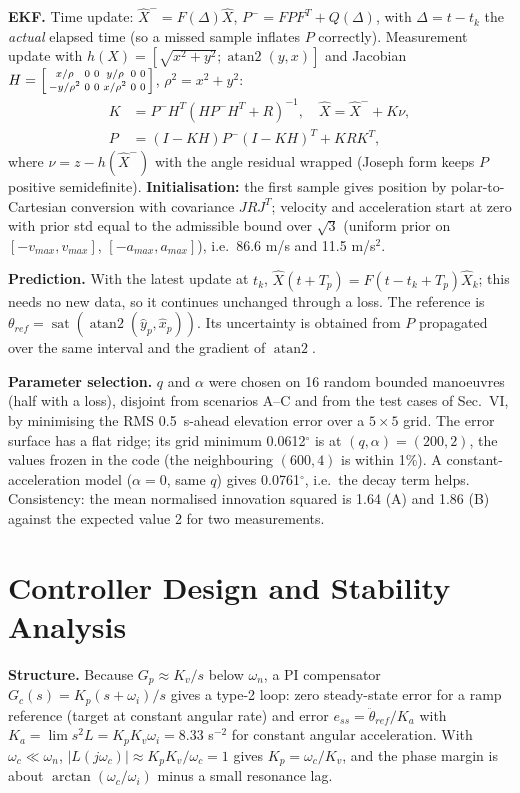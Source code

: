 \documentclass[conference]{IEEEtran}
\newcommand{\dg}{^\circ}
\begin{document}
\textbf{EKF.} Time update: $\hat X^-=F(\Delta)\hat X$, $P^-=FPF^T+Q(\Delta)$, with $\Delta=t-t_{k}$ the \emph{actual} elapsed time (so a missed sample inflates $P$ correctly). Measurement update with $h(X)=[\sqrt{x^2+y^2};\operatorname{atan2}(y,x)]$ and Jacobian $H=\begin{bsmallmatrix}x/\rho&0&0&y/\rho&0&0\\-y/\rho^2&0&0&x/\rho^2&0&0\end{bsmallmatrix}$, $\rho^2=x^2+y^2$:
\begin{align}
K&=P^-H^T(HP^-H^T+R)^{-1},\quad \hat X=\hat X^-+K\nu,\\
P&=(I-KH)P^-(I-KH)^T+KRK^T,
\end{align}
where $\nu=z-h(\hat X^-)$ with the angle residual wrapped (Joseph form keeps $P$ positive semidefinite). \textbf{Initialisation:} the first sample gives position by polar-to-Cartesian conversion with covariance $JRJ^T$; velocity and acceleration start at zero with prior std equal to the admissible bound over $\sqrt3$ (uniform prior on $[-v_{max},v_{max}]$, $[-a_{max},a_{max}]$), i.e.\ 86.6 m/s and 11.5 m/s$^2$.

\textbf{Prediction.} With the latest update at $t_k$, $\hat X(t+T_p)=F(t-t_k+T_p)\hat X_k$; this needs no new data, so it continues unchanged through a loss. The reference is $\theta_{ref}=\operatorname{sat}(\operatorname{atan2}(\hat y_p,\hat x_p))$. Its uncertainty is obtained from $P$ propagated over the same interval and the gradient of $\operatorname{atan2}$.

\textbf{Parameter selection.} $q$ and $\alpha$ were chosen on 16 random bounded manoeuvres (half with a loss), disjoint from scenarios A--C and from the test cases of Sec.~VI, by minimising the RMS 0.5~s-ahead elevation error over a $5\times5$ grid. The error surface has a flat ridge; its grid minimum 0.0612$\dg$ is at $(q,\alpha)=(200,2)$, the values frozen in the code (the neighbouring $(600,4)$ is within 1\%). A constant-acceleration model ($\alpha=0$, same $q$) gives 0.0761$\dg$, i.e.\ the decay term helps. Consistency: the mean normalised innovation squared is 1.64 (A) and 1.86 (B) against the expected value 2 for two measurements.

\section{Controller Design and Stability Analysis}
\textbf{Structure.} Because $G_p\approx K_v/s$ below $\omega_n$, a PI compensator $G_c(s)=K_p(s+\omega_i)/s$ gives a type-2 loop: zero steady-state error for a ramp reference (target at constant angular rate) and error $e_{ss}=\ddot\theta_{ref}/K_a$ with $K_a=\lim s^2L=K_pK_v\omega_i=8.33$ s$^{-2}$ for constant angular acceleration. With $\omega_c\ll\omega_n$, $|L(j\omega_c)|\approx K_pK_v/\omega_c=1$ gives $K_p=\omega_c/K_v$, and the phase margin is about $\arctan(\omega_c/\omega_i)$ minus a small resonance lag.
\end{document}
